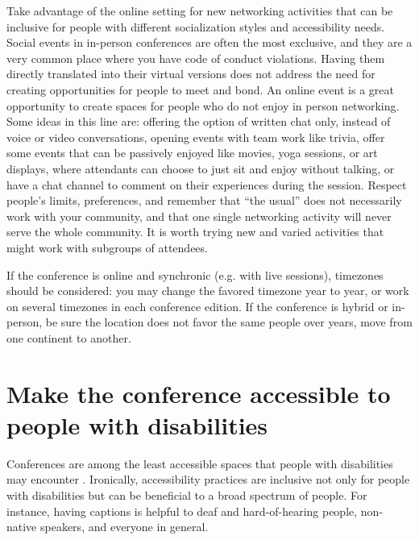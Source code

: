 \documentclass[10pt,letterpaper]{article}
\begin{document}
Take advantage of the online setting for new networking activities that can be inclusive for people with different socialization styles and accessibility needs. Social events in in-person conferences are often the most exclusive, and they are a very common place where you have code of conduct violations.
Having them directly translated into their virtual versions does not address the need for creating opportunities for people to meet and bond. An online event is a great opportunity to create spaces for people who do not enjoy in person networking. Some ideas in this line are: offering the option of written chat only, instead of voice or video conversations, opening events with team work like trivia, offer some events that can be passively enjoyed like movies, yoga sessions, or art displays, where attendants can choose to just sit and enjoy without talking, or have a chat channel to comment on their experiences during the session. Respect people’s limits, preferences, and remember that “the usual” does not necessarily work with your community, and that one single networking activity will never serve the whole community. It is worth trying new and varied activities that might work with subgroups of attendees.

If the conference is online and synchronic (e.g. with live sessions), timezones should be considered: you may change the favored timezone year to year, or work on several timezones in each conference edition. If the conference is hybrid or in-person, be sure the location does not favor the same people over years, move from one continent to another.


\section{Make the conference accessible to people with disabilities}
\label{rule_accessibility}

Conferences are among the least accessible spaces that people with disabilities may encounter \cite{priceAccessImaginedConstruction2009}.
Ironically, accessibility practices are inclusive not only for people with disabilities but can be beneficial to a broad spectrum of people. For instance, having captions is helpful to deaf and hard-of-hearing people, non-native speakers, and everyone in general. 
\end{document}
